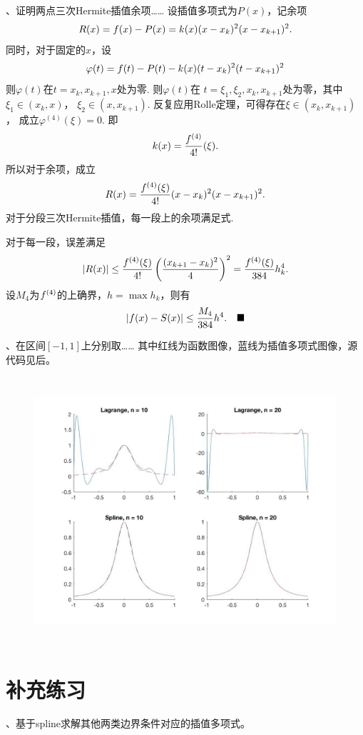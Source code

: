 \vspace{1cm}
\par{}、证明两点三次Hermite插值余项……
\proof
  设插值多项式为$P(x)$，记余项
  \[
    R(x) = \mathnormal{f}(x) - P(x) = k(x)(x-x_k)^2(x-x_{k+1})^2.
  \]
  同时，对于固定的$x$，设
  \[
    \varphi(t) = \mathnormal{f}(t) - P(t) - k(x)(t-x_k)^2(t-x_{k+1})^2
  \]
  则$\varphi(t)$在$t=x_k, x_{k+1}, x$处为零. 则$\varphi(t)$在
  $t=\xi_1,\xi_2,x_k,x_{k+1}$处为零，其中$\xi_1\in(x_k,x)$，
  $\xi_2\in(x,x_{k+1})$. 反复应用Rolle定理，可得存在$\xi\in(x_k,x_{k+1})$，
  成立$\varphi^{(4)}(\xi) = 0$. 即
  \[
    k(x) = \frac{\mathnormal{f}^{(4)}}{4!}(\xi).
  \]
  所以对于余项，成立
  \begin{equation}
    \label{equ: Hermite余项}
    R(x) = \frac{\mathnormal{f}^{(4)}(\xi)}{4!}(x-x_k)^2(x-x_{k+1})^2.
  \end{equation}
  对于分段三次Hermite插值，每一段上的余项满足式.
  \par 对于每一段，误差满足
  \[
    |R(x)| \le \frac{\mathnormal{f}^{(4)}(\xi)}{4!}
    \left( \frac{(x_{k+1}-x_k)^2}{4}  \right)^2
    = \frac{\mathnormal{f}^{(4)}(\xi)}{384}h_k^4.
  \]
  设$M_4$为$\mathnormal{f}^{(4)}$的上确界，$h = \max h_k$，则有
  \[
    |\mathnormal{f}(x) - S(x)| \le \frac{M_4}{384}h^4.\quad\blacksquare
  \]


\vspace{1cm}
\par{}、在区间$[-1,1]$上分别取……
\ans
  其中红线为函数图像，蓝线为插值多项式图像，源代码见后。
  \begin{figure}[htbp]
  \centering
  \includegraphics[height=9.9cm]{interp.jpg}
  \end{figure}
  \newpage
  


\newpage
\section{补充练习}
\par{}、基于spline求解其他两类边界条件对应的插值多项式。
  


